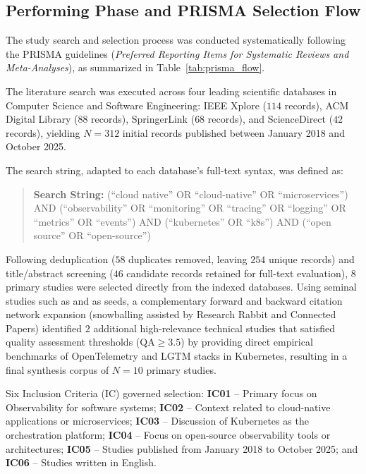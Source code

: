 \subsection{Performing Phase and PRISMA Selection Flow}

The study search and selection process was conducted systematically following the PRISMA guidelines (\textit{Preferred Reporting Items for Systematic Reviews and Meta-Analyses}), as summarized in Table~\ref{tab:prisma_flow}.



The literature search was executed across four leading scientific databases in Computer Science and Software Engineering: IEEE Xplore ($114$ records), ACM Digital Library ($88$ records), SpringerLink ($68$ records), and ScienceDirect ($42$ records), yielding $N = 312$ initial records published between January 2018 and October 2025.

The search string, adapted to each database's full-text syntax, was defined as:
\begin{quote}
\textbf{Search String:} (``cloud native'' OR ``cloud-native'' OR ``microservices'') AND (``observability'' OR ``monitoring'' OR ``tracing'' OR ``logging'' OR ``metrics'' OR ``events'') AND (``kubernetes'' OR ``k8s'') AND (``open source'' OR ``open-source'')
\end{quote}

Following deduplication ($58$ duplicates removed, leaving $254$ unique records) and title/abstract screening ($46$ candidate records retained for full-text evaluation), $8$ primary studies were selected directly from the indexed databases. Using seminal studies such as \cite{kosinska_2023} and \cite{usman_2022} as seeds, a complementary forward and backward citation network expansion (snowballing assisted by Research Rabbit and Connected Papers) identified $2$ additional high-relevance technical studies \cite{araujo_2024, hartikainen_2024} that satisfied quality assessment thresholds ($\text{QA} \ge 3.5$) by providing direct empirical benchmarks of OpenTelemetry and LGTM stacks in Kubernetes, resulting in a final synthesis corpus of $N = 10$ primary studies.

Six Inclusion Criteria (IC) governed selection: \textbf{IC01} -- Primary focus on Observability for software systems; \textbf{IC02} -- Context related to cloud-native applications or microservices; \textbf{IC03} -- Discussion of Kubernetes as the orchestration platform; \textbf{IC04} -- Focus on open-source observability tools or architectures; \textbf{IC05} -- Studies published from January 2018 to October 2025; and \textbf{IC06} -- Studies written in English.

